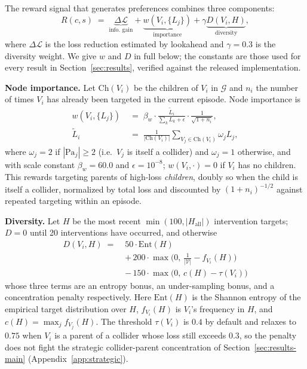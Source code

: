 \documentclass[twoside]{article}
\theoremstyle{plain}
\theoremstyle{definition}
\theoremstyle{remark}
\begin{document}
The reward signal that generates preferences combines three components:
\begin{equation}
\label{eq:reward}
R(c, s) \;=\; \underbrace{\Delta\mathcal{L}}_{\text{info.\ gain}} + \underbrace{w(V_i, \{L_j\})}_{\text{importance}} + \gamma \underbrace{D(V_i, H)}_{\text{diversity}},
\end{equation}
where $\Delta\mathcal{L}$ is the loss reduction estimated by lookahead and $\gamma = 0.3$ is the diversity weight. We give $w$ and $D$ in full below; the constants are those used for every result in Section~\ref{sec:results}, verified against the released implementation.

\textbf{Node importance.} Let $\text{Ch}(V_i)$ be the children of $V_i$ in $\mathcal{G}$ and $n_i$ the number of times $V_i$ has already been targeted in the current episode. Node importance is
\begin{align}
\label{eq:node-importance}
w(V_i, \{L_j\}) &\;=\; \beta_w \cdot \frac{\widetilde{L}_i}{\sum_k L_k + \epsilon} \cdot \frac{1}{\sqrt{1 + n_i}}, \\
\widetilde{L}_i &\;=\; \frac{1}{|\text{Ch}(V_i)|}\sum_{V_j \in \text{Ch}(V_i)} \omega_j L_j, \nonumber
\end{align}
where $\omega_j = 2$ if $|\text{Pa}_j| \ge 2$ (i.e.\ $V_j$ is itself a collider) and $\omega_j = 1$ otherwise,
and with scale constant $\beta_w = 60.0$ and $\epsilon = 10^{-8}$; $w(V_i,\cdot)=0$ if $V_i$ has no children. This rewards targeting parents of high-loss \emph{children}, doubly so when the child is itself a collider, normalized by total loss and discounted by $(1+n_i)^{-1/2}$ against repeated targeting within an episode.

\textbf{Diversity.} Let $H$ be the most recent $\min(100,|H_\text{all}|)$ intervention targets; $D=0$ until 20 interventions have occurred, and otherwise
\begin{align}
\label{eq:diversity}
D(V_i, H) \;=\;& 50 \cdot \mathrm{Ent}(H) \nonumber \\
&+\, 200 \cdot \max\!\big(0,\, \tfrac{1}{|\mathcal V|} - f_{V_i}(H)\big) \nonumber \\
&-\, 150 \cdot \max\!\big(0,\, c(H) - \tau(V_i)\big)
\end{align}
whose three terms are an entropy bonus, an under-sampling bonus, and a concentration penalty respectively. Here $\mathrm{Ent}(H)$ is the Shannon entropy of the empirical target distribution over $H$, $f_{V_i}(H)$ is $V_i$'s frequency in $H$, and $c(H)=\max_j f_{V_j}(H)$. The threshold $\tau(V_i)$ is $0.4$ by default and relaxes to $0.75$ when $V_i$ is a parent of a collider whose loss still exceeds $0.3$, so the penalty does not fight the strategic collider-parent concentration of Section~\ref{sec:results-main} (Appendix~\ref{app:strategic}).
\end{document}
